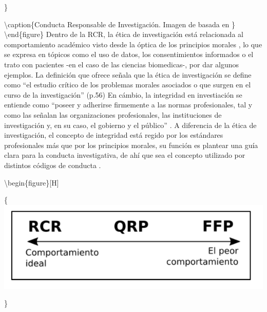 \documentclass[
]{book}
\begin{document}
\}

\textbackslash caption\{Conducta Responsable de Investigación. Imagen de \citet{abrilruiz_Manzanas_2019} basada en \citet{steneck_Fostering_2006}\}\label{fig:rcr}
\textbackslash end\{figure\}
Dentro de la RCR, la ética de investigación está relacionada al comportamiento académico visto desde la óptica de los principios morales \citep{steneck_Fostering_2006}, lo que se expresa en tópicos como el uso de datos, los consentimientos informados o el trato con pacientes -en el caso de las ciencias biomedicas-, por dar algunos ejemplos. La definición que ofrece \citet{steneck_Fostering_2006} señala que la ética de investigación se define como ``el estudio crítico de los problemas morales asociados o que surgen en el curso de la investigación'' (p.56) En cámbio, la integridad en investiación se entiende como ``poseer y adherirse firmemente a las normas profesionales, tal y como las señalan las organizaciones profesionales, las instituciones de investigación y, en su caso, el gobierno y el público'' \citep[p.56]{steneck_Fostering_2006}. A diferencia de la ética de investigación, el concepto de integridad está regido por los estándares profesionales más que por los principios morales, su función es plantear una guía clara para la conducta investigativa, de ahí que sea el concepto utilizado por distintos códigos de conducta \citep[ver][]{abrilruiz_Manzanas_2019}.

\textbackslash begin\{figure\}{[}H{]}

\{\centering \includegraphics[width=1\linewidth]{docs/images/grad}

\}
\end{document}
